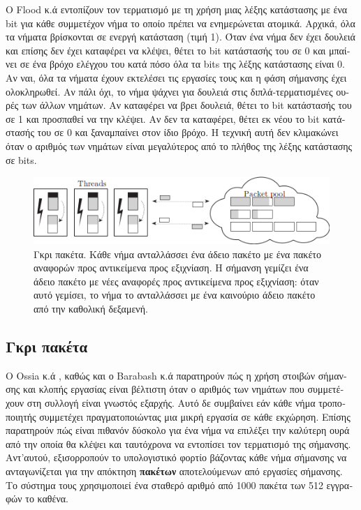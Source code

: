 \begin{greek}
Ο Flood κ.ά \cite{DBLP:conf/jvm/FloodDSZ01} εντοπίζουν τον
τερματισμό με τη χρήση μιας λέξης κατάστασης με ένα bit για
κάθε συμμετέχον νήμα το οποίο πρέπει να ενημερώνεται ατομικά.
Αρχικά, όλα τα νήματα βρίσκονται σε ενεργή κατάσταση (τιμή 1).
Όταν ένα νήμα δεν έχει δουλειά και επίσης δεν έχει καταφέρει
να κλέψει, θέτει το bit κατάστασής του σε 0 και μπαίνει σε
ένα βρόχο ελέγχου του κατά πόσο όλα τα bits της λέξης κατάστασης
είναι 0. Αν ναι, όλα τα νήματα έχουν εκτελέσει τις εργασίες
τους και η φάση σήμανσης έχει ολοκληρωθεί. Αν πάλι όχι, το νήμα
ψάχνει για δουλειά στις διπλά-τερματισμένες ουρές των άλλων
νημάτων. Αν καταφέρει να βρει δουλειά, θέτει το bit κατάστασής
του σε 1 και προσπαθεί να την κλέψει. Αν δεν τα καταφέρει,
θέτει εκ νέου το bit κατάστασής του σε 0 και ξαναμπαίνει στον
ίδιο βρόχο. Η τεχνική αυτή δεν κλιμακώνει όταν ο αριθμός των
νημάτων είναι μεγαλύτερος από το πλήθος της λέξης κατάστασης
σε bits.

\begin{figure}
  \centering
  \includegraphics{figures/par_2}
  \caption[Γκρι πακέτα.]
    {Γκρι πακέτα. Κάθε νήμα ανταλλάσσει ένα άδειο πακέτο με
     ένα πακέτο αναφορών προς αντικείμενα προς εξιχνίαση. Η
     σήμανση γεμίζει ένα άδειο πακέτο με νέες αναφορές προς
     αντικείμενα προς εξιχνίαση: όταν αυτό γεμίσει, το νήμα
     το ανταλλάσσει με ένα καινούριο άδειο πακέτο από την
     καθολική δεξαμενή.}
  \label{fig:par_2}
\end{figure}

\subsection{Γκρι πακέτα}
Ο Ossia κ.ά \cite{DBLP:conf/pldi/OssiaBGKLO02}, καθώς και ο
Barabash κ.ά \cite{DBLP:journals/toplas/BarabashBGKLOOP05} 
παρατηρούν πώς η χρήση στοιβών
σήμανσης και κλοπής εργασίας είναι βέλτιστη όταν ο αριθμός των
νημάτων που συμμετέχουν στη συλλογή είναι γνωστός εξαρχής. Αυτό
δε συμβαίνει εάν κάθε νήμα τροποποιητής συμμετέχει πραγματοποιώντας
μια μικρή εργασία σε κάθε εκχώρηση. Επίσης παρατηρούν πώς είναι
πιθανόν δύσκολο για ένα νήμα να επιλέξει την καλύτερη ουρά από
την οποία θα κλέψει και ταυτόχρονα να εντοπίσει τον τερματισμό
της σήμανσης. Αντ'αυτού, εξισορροπούν το υπολογιστικό φορτίο
βάζοντας κάθε νήμα σήμανσης να ανταγωνίζεται για την απόκτηση
\textbf{πακέτων} αποτελούμενων από εργασίες σήμανσης. Το σύστημα
τους χρησιμοποιεί ένα σταθερό αριθμό από 1000 πακέτα των 512
εγγραφών το καθένα.


\end{greek}
